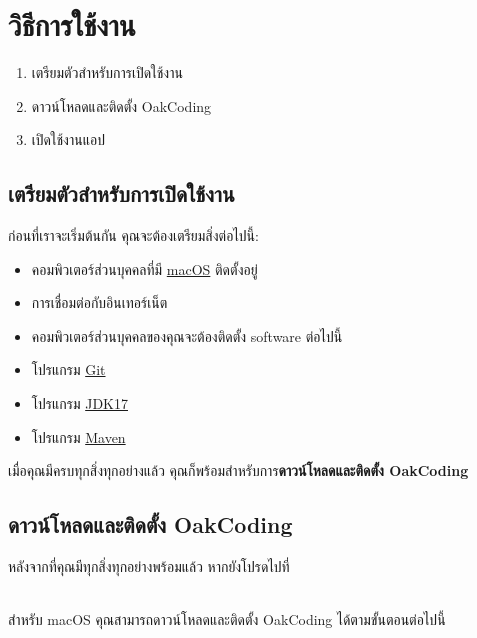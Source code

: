 \documentclass[../docs.tex]{subfiles}
\begin{document}
\section{วิธีการใช้งาน}

\setlength{\baselineskip}{1ex}


\begin{enumerate}
    \setlength{\itemsep}{0.7pt}
    \item เตรียมตัวสำหรับการเปิดใช้งาน
    \item ดาวน์โหลดและติดตั้ง OakCoding
    \item เปิดใช้งานแอป
\end{enumerate}

\rule{0em}{1ex}

\subsection*{เตรียมตัวสำหรับการเปิดใช้งาน}\label{sec:prerequisites}

ก่อนที่เราจะเริ่มต้นกัน คุณจะต้องเตรียมสิ่งต่อไปนี้:

\begin{itemize}
    \setlength{\itemsep}{0.7pt}
    \item คอมพิวเตอร์ส่วนบุคคลที่มี \href{https://www.apple.com/macos/}{macOS} ติดตั้งอยู่
    \item การเชื่อมต่อกับอินเทอร์เน็ต
    \item คอมพิวเตอร์ส่วนบุคคลของคุณจะต้องติดตั้ง software ต่อไปนี้
    \item โปรแกรม \href{https://git-scm.com/}{Git}
    \item โปรแกรม \href{https://openjdk.org/}{JDK17}
    \item โปรแกรม \href{https://maven.apache.org/}{Maven}
\end{itemize}

เมื่อคุณมีครบทุกสิ่งทุกอย่างแล้ว คุณก็พร้อมสำหรับการ\textbf{ดาวน์โหลดและติดตั้ง OakCoding}

\label{subsec:installation}
\subsection*{ดาวน์โหลดและติดตั้ง OakCoding}

หลังจากที่คุณมีทุกสิ่งทุกอย่างพร้อมแล้ว หากยังโปรดไปที่ \\
\rule{0em}{1ex}\\
สำหรับ macOS คุณสามารถดาวน์โหลดและติดตั้ง OakCoding ได้ตามขั้นตอนต่อไปนี้
\end{document}
